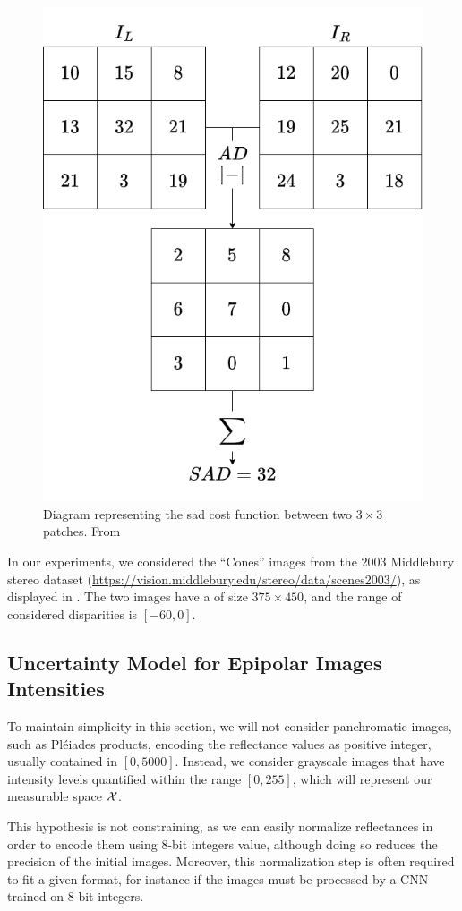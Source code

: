 \begin{figure}
    \centering
    \includegraphics[width=0.5\linewidth]{Images/Chap_4/SAD.png}
    \caption{Diagram representing the \acrshort{sad} cost function between two $3\times3$ patches. From \cite{malinowski_uncertainty_2024}}
    \label{fig:SAD}
\end{figure}

In our experiments, we considered the ``Cones'' images from the 2003 Middlebury stereo dataset (\url{https://vision.middlebury.edu/stereo/data/scenes2003/}), as displayed in . The two images have a of size $375 \times 450$, and the range of considered disparities is $[-60, 0]$.

\subsection{Uncertainty Model for Epipolar Images Intensities}\label{sec:uncertainty_models_for_epi_image}
To maintain simplicity in this section, we will not consider panchromatic images, such as Pléiades products, encoding the reflectance values as positive integer, usually contained in $[0, 5000]$. Instead, we consider grayscale images that have intensity levels quantified within the range $[0, 255]$, which will represent our measurable space $\mathcal{X}$.

\begin{remark}
    This hypothesis is not constraining, as we can easily normalize reflectances in order to encode them using 8-bit integers value, although doing so reduces the precision of the initial images. Moreover, this normalization step is often required to fit a given format, for instance if the images must be processed by a CNN trained on 8-bit integers.
\end{remark}

